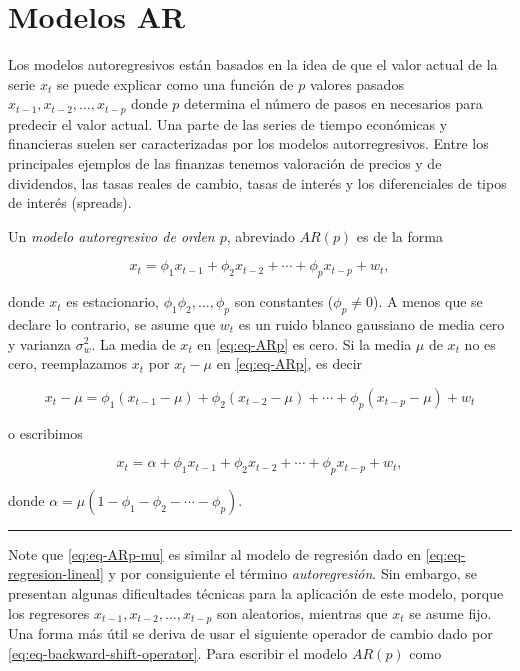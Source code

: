 \documentclass[12pt,]{krantz}
\theoremstyle{definition}
\theoremstyle{definition}
\theoremstyle{definition}
\theoremstyle{remark}
\let\BeginKnitrBlock\begin \let\EndKnitrBlock\end
\begin{document}
\chapter{Modelos AR}\label{modelos-ar}

Los modelos autoregresivos están basados en la idea de que el valor
actual de la serie \(x_t\) se puede explicar como una función de \(p\)
valores pasados \(x_{t-1},x_{t-2},\ldots,x_{t-p}\) donde \(p\) determina
el número de pasos en necesarios para predecir el valor actual. Una
parte de las series de tiempo económicas y financieras suelen ser
caracterizadas por los modelos autorregresivos. Entre los principales
ejemplos de las finanzas tenemos valoración de precios y de dividendos,
las tasas reales de cambio, tasas de interés y los diferenciales de
tipos de interés (spreads).

\BeginKnitrBlock{definition}
\protect\hypertarget{def:defi-modelo-ARp}{}{\label{def:defi-modelo-ARp} }Un
\emph{modelo autoregresivo de orden \(p\)}, abreviado \(AR(p)\) es de la
forma

\begin{equation}
x_t=\phi_1x_{t-1}+\phi_2x_{t-2}+\cdots+\phi_px_{t-p}+w_t,
\label{eq:eq-ARp}
\end{equation}

donde \(x_t\) es estacionario, \(\phi_1\phi_2,\ldots,\phi_p\) son
constantes (\(\phi_p\neq0\)). A menos que se declare lo contrario, se
asume que \(w_t\) es un ruido blanco gaussiano de media cero y varianza
\(\sigma_w^2\). La media de \(x_t\) en \eqref{eq:eq-ARp} es cero. Si la
media \(\mu\) de \(x_t\) no es cero, reemplazamos \(x_t\) por
\(x_t-\mu\) en \eqref{eq:eq-ARp}, es decir

\[x_t-\mu=\phi_1(x_{t-1}-\mu)+\phi_2(x_{t-2}-\mu)+\cdots+\phi_p(x_{t-p}-\mu)+w_t\]

o escribimos

\begin{equation}
x_t=\alpha+\phi_1x_{t-1}+\phi_2x_{t-2}+\cdots+\phi_px_{t-p}+w_t,
\label{eq:eq-ARp-mu}
\end{equation}

donde \(\alpha=\mu(1-\phi_1-\phi_2-\cdots-\phi_p)\).
\EndKnitrBlock{definition}

\begin{center}\rule{0.5\linewidth}{\linethickness}\end{center}

Note que \eqref{eq:eq-ARp-mu} es similar al modelo de regresión dado en
\eqref{eq:eq-regresion-lineal} y por consiguiente el término
\emph{autoregresión}. Sin embargo, se presentan algunas dificultades
técnicas para la aplicación de este modelo, porque los regresores
\(x_{t-1},x_{t-2},\ldots,x_{t-p}\) son aleatorios, mientras que \(x_t\)
se asume fijo. Una forma más útil se deriva de usar el siguiente
operador de cambio dado por \eqref{eq:eq-backward-shift-operator}. Para
escribir el modelo \(AR(p)\) como
\end{document}
